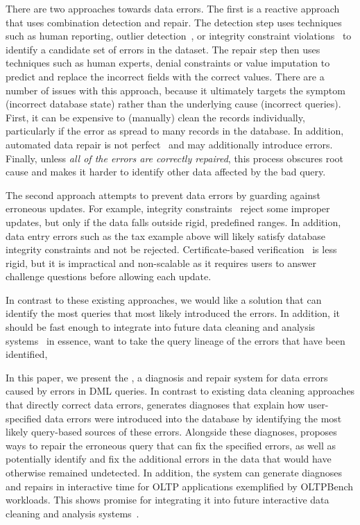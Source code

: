 There are two approaches towards data errors.  The first is a reactive approach that uses combination detection and repair.  The detection step uses techniques such as human reporting, outlier detection~\cite{}, or integrity constraint violations~\cite{} to identify a candidate set of errors in the dataset.  
The repair step then uses techniques such as human experts, denial constraints or value imputation to predict and replace the incorrect fields with the correct values.   There are a number of issues with this approach, because it ultimately targets the symptom (incorrect database state) rather than the underlying cause (incorrect queries).  First, it can be expensive to (manually) clean the records individually, particularly if the error as spread to many records in the database.  In addition, automated data repair is not perfect~\cite{paolo study} and may additionally introduce errors.  Finally, unless {\it all of the errors are correctly repaired}, this process obscures root cause and makes it harder to identify other data affected by the bad query.

The second approach attempts to prevent data errors by guarding against erroneous updates.  For example, integrity constraints~\cite{Khoussainova2006} reject some improper updates, but only if the data falls outside rigid, predefined ranges.  In addition, data entry errors such as the tax example above will likely satisfy database integrity constraints and not be rejected.  Certificate-based verification~\cite{Chen2011} is less rigid, but it is impractical and non-scalable as it requires users to answer challenge questions before allowing each update.

In contrast to these existing approaches, we would like a solution that can identify the most  queries that most likely introduced the errors.  
In addition, it should be fast enough to integrate into future data cleaning and analysis systems~\cite{wisteria, hildacleaning}
in essence, want to take the query lineage of the errors that have been identified, 

In this paper, we present the \sys, a diagnosis and repair system for data errors caused by errors in DML queries.  In contrast to existing data cleaning approaches that directly correct data errors, \sys generates diagnoses that explain how user-specified data errors were introduced into the database by identifying the most likely query-based sources of these errors.  Alongside these diagnoses, \sys proposes ways to repair the erroneous query that can fix the specified errors, as well as potentially identify and fix the additional errors in the data that would have otherwise remained undetected.  In addition, the system can generate diagnoses and repairs in interactive time for OLTP applications  exemplified by OLTPBench workloads.  This shows promise for integrating it into future interactive data cleaning and analysis systems~\cite{paolo,wisteria,hildacleaning}.  


